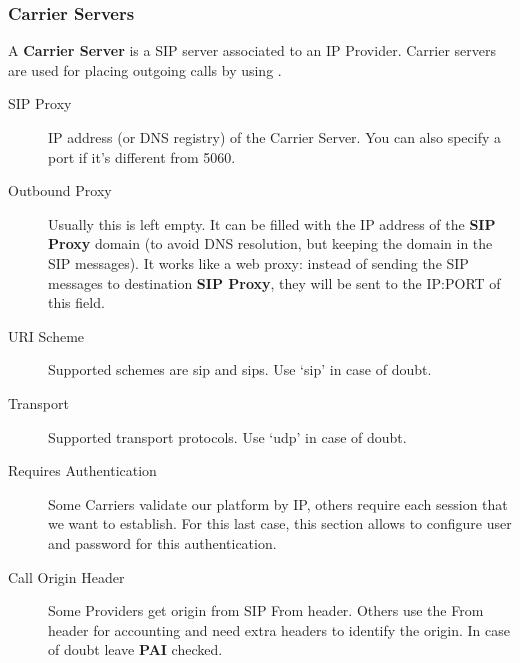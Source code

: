 \documentclass[letterpaper,10pt,spanish]{sphinxmanual}
\begin{document}
\subsubsection{Carrier Servers}
\label{administration_portal/brand/providers/carriers:carrier-servers}
A \textbf{Carrier Server} is a SIP server associated to an IP Provider. Carrier servers
are used for placing outgoing calls by using {\hyperref[administration_portal/brand/routing/outgoing_routings:outgoing\string-routings]{}}.
\begin{description}
\item[{SIP Proxy}] \leavevmode{}\label{administration_portal/brand/providers/carriers:term-sip-proxy}
IP address (or DNS registry) of the Carrier Server. You can also specify
a port if it's different from 5060.

\item[{Outbound Proxy}] \leavevmode{}\label{administration_portal/brand/providers/carriers:term-outbound-proxy}
Usually this is left empty. It can be filled with the IP address of the
\textbf{SIP Proxy} domain (to avoid DNS resolution, but keeping the domain
in the SIP messages). It works like a web proxy: instead of sending the
SIP messages to destination \textbf{SIP Proxy}, they will be sent to the
IP:PORT of this field.

\item[{URI Scheme}] \leavevmode{}\label{administration_portal/brand/providers/carriers:term-uri-scheme}
Supported schemes are sip and sips. Use `sip' in case of doubt.

\item[{Transport}] \leavevmode{}\label{administration_portal/brand/providers/carriers:term-transport}
Supported transport protocols. Use `udp' in case of doubt.

\item[{Requires Authentication}] \leavevmode{}\label{administration_portal/brand/providers/carriers:term-requires-authentication}
Some Carriers validate our platform by IP, others require
each session that we want to establish. For this last case, this section
allows to configure user and password for this authentication.

\item[{Call Origin Header}] \leavevmode{}\label{administration_portal/brand/providers/carriers:term-call-origin-header}
Some Providers get origin from SIP From header. Others use the From
header for accounting and need extra headers to identify the origin.
In case of doubt leave \textbf{PAI} checked.


\end{description}
\end{document}
